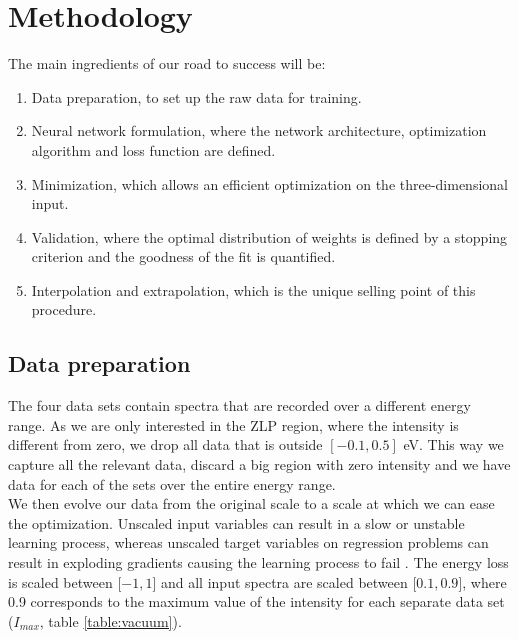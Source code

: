 \documentclass[11pt,a4paper]{article}
\numberwithin{equation}{section}
\numberwithin{figure}{section}
\numberwithin{table}{section}
\begin{document}
\section{Methodology}

The main ingredients of our road to success will be:
\begin{enumerate}
    \item Data preparation, to set up the raw data for training.
    \item Neural network formulation, where the network architecture, optimization algorithm and loss function are defined.
    \item Minimization, which allows an efficient optimization on the three-dimensional input.
    \item Validation, where the optimal distribution of weights is defined by a stopping criterion and the goodness of the fit is quantified. 
    \item Interpolation and extrapolation, which is the unique selling point of this procedure. 
\end{enumerate}

\subsection{Data preparation}
The four data sets contain spectra that are recorded over a different energy range. As we are only interested in the ZLP region, where the intensity is different from zero, we drop all data that is outside $[-0.1, 0.5]$ eV. This way we capture all the relevant data, discard a big region with zero intensity and we have data for each of the sets over the entire energy range. \\
We then evolve our data from the original scale to a scale at which we can ease the optimization. Unscaled input variables can result in a slow or unstable learning process, whereas unscaled target variables on regression problems can result in exploding gradients causing the learning process to fail \cite{juan}. The energy loss is scaled between [$-1,1$] and all input spectra are scaled between [$0.1, 0.9$], where 0.9 corresponds to the maximum value of the intensity for each separate data set ($I_{max}$, table \ref{table:vacuum}). 
\end{document}

